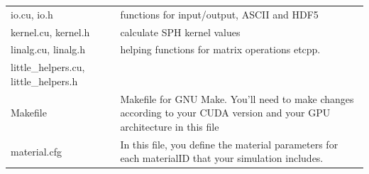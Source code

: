 \documentclass[10pt,fleqn,twoside]{article}
\begin{document}
\begin{table}
\begin{tabular}[b]{p{6cm} p{9cm}}
  io.cu, io.h                                                   & functions for input/output, ASCII and HDF5                                                                                                                                                                                                                                                                                                                 \\
  kernel.cu, kernel.h                                           & calculate SPH kernel values                                                                                                                                                                                                                                                                                                                                \\
  linalg.cu, linalg.h                                           & helping functions for matrix operations etcpp.                                                                                                                                                                                                                                                                                                             \\
  little\_helpers.cu, little\_helpers.h                         &                                                                                                                                                                                                                                                                                                                                                            \\
  Makefile                                                      & Makefile for GNU Make. You'll need to make changes according to your CUDA version and your GPU architecture in this file                                                                                                                                                                                                                                   \\
  material.cfg                                                  & In this file, you define the material parameters for each materialID that your simulation includes.                                                                                                                                                                                                                                                        \\

\end{tabular}
\end{table}
\end{document}

